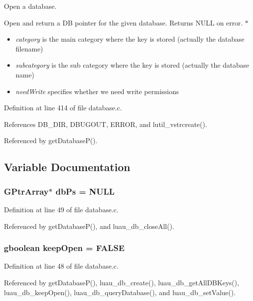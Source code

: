Open a database. 

Open and return a DB pointer for the given database. Returns NULL on error. $\ast$ \begin{itemize}
\item {\em category\/} is the main category where the key is stored (actually the database filename) \item {\em subcategory\/} is the sub category where the key is stored (actually the database name) \item {\em need\-Write\/} specifies whether we need write permissions 
\end{itemize}


Definition at line 414 of file database.c.

References DB\_\-DIR, DBUGOUT, ERROR, and lutil\_\-vstrcreate().

Referenced by get\-Database\-P().

\subsection{Variable Documentation}
\subsubsection{\setlength{\rightskip}{0pt plus 5cm}GPtr\-Array$\ast$ {\bf db\-Ps} = NULL}\label{database_8c_a1}




Definition at line 49 of file database.c.

Referenced by get\-Database\-P(), and luau\_\-db\_\-close\-All().
\subsubsection{\setlength{\rightskip}{0pt plus 5cm}gboolean {\bf keep\-Open} = FALSE}\label{database_8c_a0}




Definition at line 48 of file database.c.

Referenced by get\-Database\-P(), luau\_\-db\_\-create(), luau\_\-db\_\-get\-All\-DBKeys(), luau\_\-db\_\-keep\-Open(), luau\_\-db\_\-query\-Database(), and luau\_\-db\_\-set\-Value().